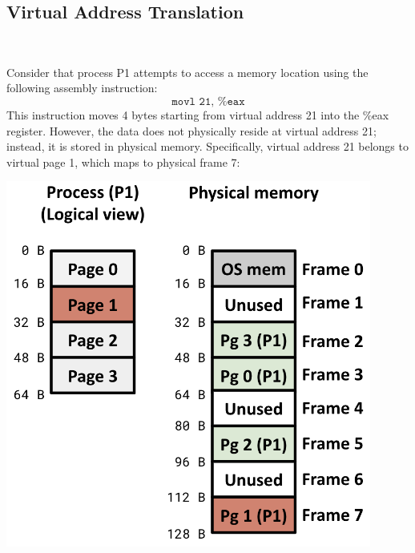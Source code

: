 \subsection{Virtual Address Translation}

\begin{example}
\leavevmode \\[2px]
\noindent
\begin{minipage}{0.45\textwidth}
Consider that process P1 attempts to access a memory location using the following assembly instruction:
\[
\texttt{movl 21, \%eax}
\]
This instruction moves 4 bytes starting from virtual address 21 into the \%eax register. However, the data does not physically reside at virtual address 21; instead, it is stored in physical memory. Specifically, virtual address 21 belongs to virtual page 1, which maps to physical frame 7:
\end{minipage}%
\hfill
\vline
\hfill
\begin{minipage}{0.45\textwidth}
\begin{center}
  \includegraphics[width=0.9\textwidth]{chapters/L5/images/paging-example3.png}
\end{center}
\end{minipage}\\
\end{example}
\newpage
